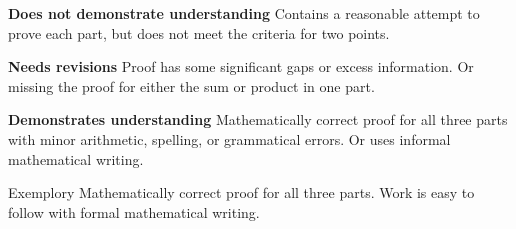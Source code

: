 \documentclass[letterpaper, 11 pt]{../ximera}
\begin{document}
\begin{problem}
    \begin{writeRubric}
        \item \textbf{Does not demonstrate understanding}
        Contains a reasonable attempt to prove each part, but does not meet the criteria for two points.
        \item \textbf{Needs revisions}
        Proof has some significant gaps or excess information. Or missing the proof for either the sum or product in one part.
        \item \textbf{Demonstrates understanding}
        Mathematically correct proof for all three parts with minor arithmetic, spelling, or grammatical errors. Or uses informal mathematical writing.
        \item [Exemplory]
        Mathematically correct proof for all three parts. Work is easy to follow with formal mathematical writing.
    \end{writeRubric}
%
\end{problem}
\end{document}

